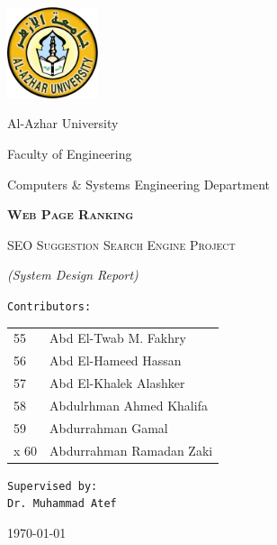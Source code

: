 \documentclass{scrartcl}
\begin{document}
\begin{titlepage}
	\centering
	\includegraphics[width=0.2\textwidth]{al-azhar.png}\par\vspace{12pt}
	{\LARGE Al-Azhar University \par}\vspace{3pt}
	{\Large Faculty of Engineering \par}
	{\Large Computers \& Systems Engineering Department \par}\vspace{12pt}
	\vfill
	{\huge\bfseries\scshape Web Page Ranking \par}\vspace{8pt}
  {\scshape SEO Suggestion Search Engine Project \par}\vspace{8pt}
  {\itshape (System Design Report) \par}
	\vfill
	{\Large\texttt{Contributors:} \\[12pt]
    \Large\itshape\ttfamily
    \begin{tabular}{ll}
      55 & Abd El-Twab M. Fakhry \\
      56 & Abd El-Hameed Hassan \\
      57 & Abd El-Khalek Alashker \\
      58 & Abdulrhman Ahmed Khalifa \\
      59 & Abdurrahman Gamal \\
x      60 & Abdurrahman Ramadan Zaki \\
    \end{tabular}
  }\par
	\vspace{1cm}
	\vfill
  {\Large\texttt{Supervised by:} \\
	\texttt{Dr. Muhammad Atef} \par}
  \vfill
  {\large \today \par}
\end{titlepage}

\newpage

\tableofcontents

\newpage
\end{document}
